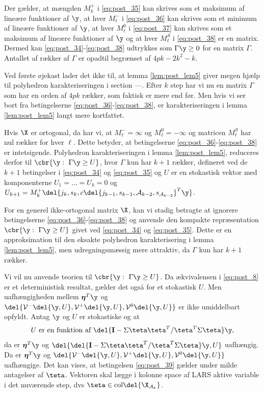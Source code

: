 \begin{lem}
Der gælder, at mængden \(M_k^+\) i \eqref{eq:post_35} kan skrives som et maksimum af lineære funktioner af \(\y\), at hver \(M_\ell^-\) i \eqref{eq:post_36} kan skrives som et minimum af lineære funktioner af \(\y\), at hver \(M_\ell^0\) i \eqref{eq:post_37} kan skrives som et maksimum af lineære funktioner af \(\y\) og at hver \(M_\ell^S\) i \eqref{eq:post_38} er en matrix.
Dermed kan \eqref{eq:post_34}-\eqref{eq:post_38} udtrykkes som \(\Gamma \y \geq 0\) for en matrix \(\Gamma\).
Antallet af rækker af \(\Gamma\) er opadtil begrænset af \(4pk - 2 k^2 -k\).
\end{lem}
%
Ved første øjekast lader det ikke til, at lemma \ref{lem:post_lem5} giver megen hjælp til polyhedron karakteriseringen i section ---.
Efter \(k\) step har vi nu en matrix \(\Gamma\) som har en orden af \(4pk\) rækker, som faktisk er mere end før.
Men hvis vi ser bort fra betingelserne \eqref{eq:post_36}-\eqref{eq:post_38}, er karakteriseringen i lemma \ref{lem:post_lem5} langt mere kortfattet.

Hvis \(\X\) er ortogonal, da har vi, at \(M_\ell^-= \infty\) og \(M_\ell^0=-\infty\) og matricen \(M_\ell^S\) har nul rækker for hver \(\ell\).
Dette betyder, at betingelserne \eqref{eq:post_36}-\eqref{eq:post_38} er intetsigende.
Polyhedron karakteriseringen i lemma \ref{lem:post_lem5}, reduceres derfor til \(\cbr{\y: \ \Gamma \y \geq U}\), hvor \(\Gamma\) kun har \(k+1\) rækker, defineret ved de \(k+1\) betingelser i \eqref{eq:post_34} og \eqref{eq:post_35} og \(U\) er en stokastisk vektor med komponenterne \(U_1 = \dots = U_k=0\) og \(U_{k+1}= M_k^+ \del{j_k,s_k, c \del{j_{k-1}, s_{k-1}, \mathcal{A}_{k-2}, s_{\mathcal{A}_{k-2}}}^T \y}\).

For en generel ikke-ortogonal matrix \(\X\), kan vi stadig betragte at ignorere betingelserne \eqref{eq:post_36}-\eqref{eq:post_38} og anvende den kompakte repræsentation \(\cbr{\y: \ \Gamma \y \geq U}\) givet ved \eqref{eq:post_34} og \eqref{eq:post_35}.
Dette er en approksimation til den eksakte polyhedron karakterisering i lemma \ref{lem:post_lem5}, men udregningsmæssig mere attraktiv, da \(\Gamma\) kun har \(k+1\) rækker.

Vi vil nu anvende teorien til \(\cbr{\y: \ \Gamma \y \geq U}\).
Da ækvivalensen  i \eqref{eq:post_8} er et deterministisk resultat, gælder det også for et stokastisk \(U\).
Men uafhængigheden mellem \(\boldsymbol{\eta}^T \y\) og \(\del{\mathcal{V}^-\del{\y, U}, \mathcal{V}^+\del{\y, U},\mathcal{V}^0\del{\y, U}}\) er ikke umiddelbart opfyldt.
Antag \(\y\) og \(U\) er stokastiske og at
\begin{align}
U \text{ er en funktion af } \del{\mathbf{I}-\Sigma \teta \teta^T / \teta^T \Sigma \teta} \y, \label{eq:post_39}
\end{align}
da er \(\boldsymbol{\eta}^T \y\) og \(\del{ \del{\mathbf{I}-\Sigma \teta \teta^T / \teta^T \Sigma \teta} \y, U }\) uafhængig. 
Da er  \(\boldsymbol{\eta}^T \y\) og \(\del{\mathcal{V}^-\del{\y, U}, \mathcal{V}^+\del{\y, U},\mathcal{V}^0\del{\y, U}}\) uafhængige.
Det kan vises, at betingelsen \eqref{eq:post_39} gælder under milde antagelser af \(\teta\).
Vektoren skal lægge i kolonne space af LARS aktive variable i det nuværende step, dvs \(\teta \in \text{col} \del{\X_{\mathcal{A}_k}}\).

